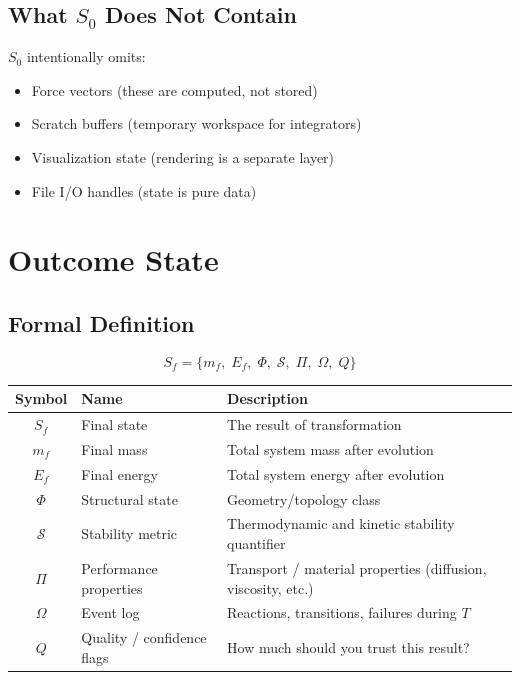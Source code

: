 \documentclass[11pt]{article}
\begin{document}
\subsection{What $S_0$ Does Not Contain}

$S_0$ intentionally omits:
\begin{itemize}
  \item Force vectors (these are computed, not stored)
  \item Scratch buffers (temporary workspace for integrators)
  \item Visualization state (rendering is a separate layer)
  \item File I/O handles (state is pure data)
\end{itemize}

\section{Outcome State}

\subsection{Formal Definition}

\begin{equation}
S_f = \{m_f, \; E_f, \; \Phi, \; \mathcal{S}, \; \Pi, \; \Omega, \; Q\}
\end{equation}

\begin{center}
\begin{tabular}{clp{8cm}}
\toprule
\textbf{Symbol} & \textbf{Name} & \textbf{Description} \\
\midrule
$S_f$ & Final state & The result of transformation \\
$m_f$ & Final mass & Total system mass after evolution \\
$E_f$ & Final energy & Total system energy after evolution \\
$\Phi$ & Structural state & Geometry/topology class \\
$\mathcal{S}$ & Stability metric & Thermodynamic and kinetic stability quantifier \\
$\Pi$ & Performance properties & Transport / material properties (diffusion, viscosity, etc.) \\
$\Omega$ & Event log & Reactions, transitions, failures during $T$ \\
$Q$ & Quality / confidence flags & How much should you trust this result? \\
\bottomrule
\end{tabular}
\end{center}
\end{document}
